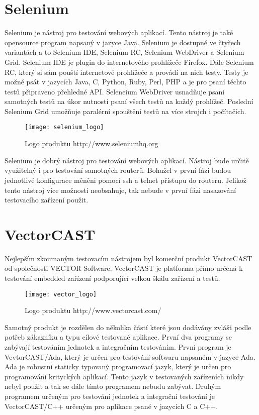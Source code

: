 \section{Selenium}
Selenium je nástroj pro testování webových aplikací. Tento nástroj je také opensource program napsaný v jazyce Java. Selenium je dostupné ve čtyřech variantách a to Selenium IDE, Selenium RC, Selenium WebDriver a Selenium Grid. Selenium IDE je plugin do internetového prohlížeče Firefox. Dále Selenium RC, který si sám pouští internetové prohlížeče a provádí na nich testy. Testy je možné psát v jazycích Java, C, Python, Ruby, Perl, PHP a je pro psaní těchto testů připraveno přehledné API. Seleneium WebDriver usnadňuje psaní samotných testů na úkor nutnosti psaní všech testů na každý prohlížeč. Poslední Selenium Grid umožňuje paralérní spouštění testů na více strojch i počítačích.

\begin{figure}[h]
  \centering
  \texttt{[image: selenium\_logo]}
  \caption{Logo produktu http://www.seleniumhq.org}
  \label{fig:selenium_logo}
\end{figure}

Selenium je dobrý nástroj pro testování webových aplikací. Nástroj bude určitě využitelný i pro testování samotných routerů. Bohužel v první fázi budou jednotlivé konfigurace měněni pomocí ssh a telnet přístupu do routeru. Jelikož tento nástroj více možností neobsahuje, tak nebude v první fázi nasazování testovacího zařízení použit.

\section{VectorCAST}
Nejlepším zkoumaným testovacím nástrojem byl komerční produkt VectorCAST od společnosti VECTOR Software. VectorCAST je platforma přímo určená k testování embedded zařízení podporující velkou škálu zařízení a testů.

\begin{figure}[h]
  \centering
  \texttt{[image: vector\_logo]}
  \caption{Logo produktu http://www.vectorcast.com/}
  \label{fig:vector_logo}
\end{figure}

Samotný produkt je rozdělen do několika částí které jsou dodávány zvlášť podle potřeb zákazníku a typu cílové testované aplikace. První dva programy se zabývají testováním jednotek a integračním testováním. První program je VevtorCAST/Ada, který je určen pro testování softwaru napsaném v jazyce Ada. Ada je robustní staticky typovaný programovací jazyk, který je určen pro programování krityckých aplikací. Tento jazyk v testovaných zařízeních nikdy nebyl použit a tak se dále tímto programem nebudu zabývat. Druhým programem určeným pro testování jednotek a integrační testování je VectorCAST/C++ určeným pro aplikace psané v jazycích C a C++.

